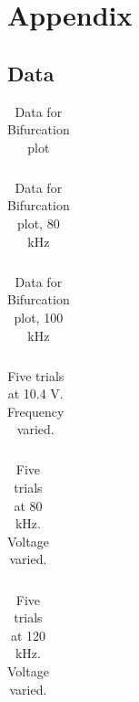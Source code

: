 \documentclass[12pt]{report}
\begin{document}
\chapter{Appendix}

\section{Data}
\label{sec:Data}

	\begin{table}[h]
		\centering
		\begin{tabular}{|l|l||l||l||l||l||l||l||l|}
			\hline
			 
		\end{tabular}
		\caption{Data for Bifurcation plot}
		\label{tab:bifurcation}
	\end{table}


	\begin{table}[h]
		\centering
		\begin{tabular}{|l|l|l||l|l|l|}
			\hline
			 
		\end{tabular}
		\caption{Data for Bifurcation plot, 80 kHz}
		\label{tab:80khz}
	\end{table}

	\begin{table}[h]
		\centering
		\begin{tabular}{|l|l|l|l||l|l|l|l|}
			\hline
			 
		\end{tabular}
		\caption{Data for Bifurcation plot, 100 kHz}
		\label{tab:100khz}
	\end{table}

	\begin{table}[h]
		\centering
		\begin{tabular}{|c|c|c|c|c|}
			\hline
			 
		\end{tabular}
		\caption{Five trials at 10.4 V. Frequency varied.}
		\label{tab:chaos3.10.4}
	\end{table}

	\begin{table}[h] 
		\centering
		\begin{tabular}{|l|l|l|l|l|l|l|l|l|l|l|l|}
			\hline
			 
		\end{tabular}
		\caption{Five trials at 80 kHz. Voltage varied.}
		\label{tab:chaos2.80khz}
	\end{table}
	
	\begin{table}[h]
		\centering
		\begin{tabular}{|l|l|l|l|l|l|l|}
			\hline
			 
		\end{tabular}
		\caption{Five trials at 120 kHz. Voltage varied.}
		\label{tab:chaos2.100khz}
	\end{table}
\end{document}
